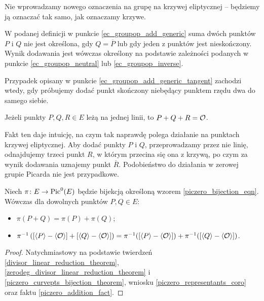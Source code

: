 \begin{remark}
Nie wprowadzamy nowego oznaczenia na grupę na krzywej eliptycznej --
będziemy ją oznaczać tak samo, jak oznaczamy krzywe.
\end{remark}

\begin{remark}
W podanej definicji w punkcie \ref{ec_groupop_add_generic}
suma dwóch punktów $P$ i $Q$
nie jest określona, gdy $Q = \overline{P}$
lub gdy jeden z punktów jest nieskończony.
Wynik dodawania jest wówczas określony
na podstawie zależności podanych w punkcie
\ref{ec_groupop_neutral} lub \ref{ec_groupop_inverse}.
\end{remark}

\begin{remark}
Przypadek opisany w punkcie \ref{ec_groupop_add_generic_tangent}
zachodzi wtedy,
gdy próbujemy dodać punkt skończony niebędący punktem rzędu dwa
do samego siebie.
\end{remark}

\begin{fact}
Jeżeli punkty $P, Q, R \in E$ leżą na jednej linii,
to $P + Q + R = \mathcal{O}$.
\end{fact}

Fakt ten daje intuicję, na czym tak naprawdę polega działanie
na punktach krzywej eliptycznej.
Aby dodać punkty $P$ i $Q$, przeprowadzamy przez nie linię,
odnajdujemy trzeci punkt $R$,
w którym przecina się ona z krzywą,
po czym za wynik dodawania uznajemy punkt $\overline{R}$.
Podobieństwo do działania w zerowej grupie Picarda nie jest przypadkowe.

\begin{theorem}
Niech $\pi \colon E \to \operatorname{Pic}^0(E)$
będzie bijekcją określoną wzorem
\ref{piczero_bijection_eqn}.
Wówczas dla dowolnych punktów $P, Q \in E$:
\begin{itemize}
\item $\pi(P + Q) = \pi(P) + \pi(Q)$;
\item
$\pi^{-1}\left(
[\left\langle P\right\rangle - \left\langle\mathcal{O}\right\rangle]
+
[\left\langle Q\right\rangle - \left\langle\mathcal{O}\right\rangle]\right
)
=
\pi^{-1}([\left\langle P\right\rangle - \left\langle\mathcal{O}\right\rangle])
+
\pi^{-1}([\left\langle Q\right\rangle - \left\langle\mathcal{O}\right\rangle])$.
\end{itemize}
\end{theorem}

\begin{proof}
Natychmiastowy na podstawie
twierdzeń
\ref{divisor_linear_reduction_theorem},
\ref{zerodeg_divisor_linear_reduction_theorem}
i \ref{piczero_curvepts_bijection_theorem},
wniosku \ref{piczero_representants_coro}
oraz faktu \ref{piczero_addition_fact}.
\end{proof}

